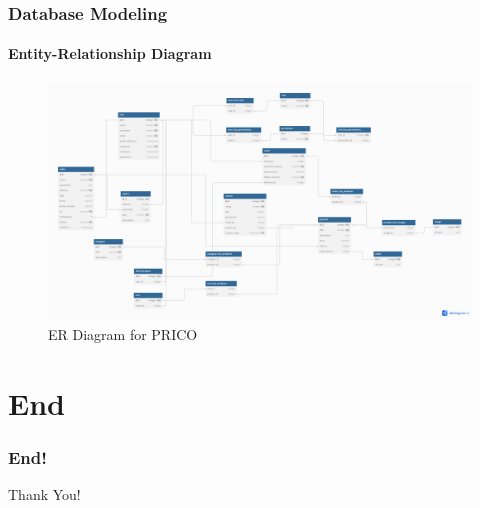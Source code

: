 \documentclass{beamer}
\begin{document}
\begin{frame}
	\frametitle{Database Modeling}
	\framesubtitle{Entity-Relationship Diagram}
	\begin{figure}
		\begin{center}
			\includegraphics[width=1\textwidth]{diagrams/er}
		\end{center}
		\caption{ER Diagram for PRICO}\label{fig:fig2}
	\end{figure}
\end{frame}

\section{End}
\begin{frame}
	\frametitle{End!}
	\Large
	\centering
	Thank You!
\end{frame}
\end{document}
